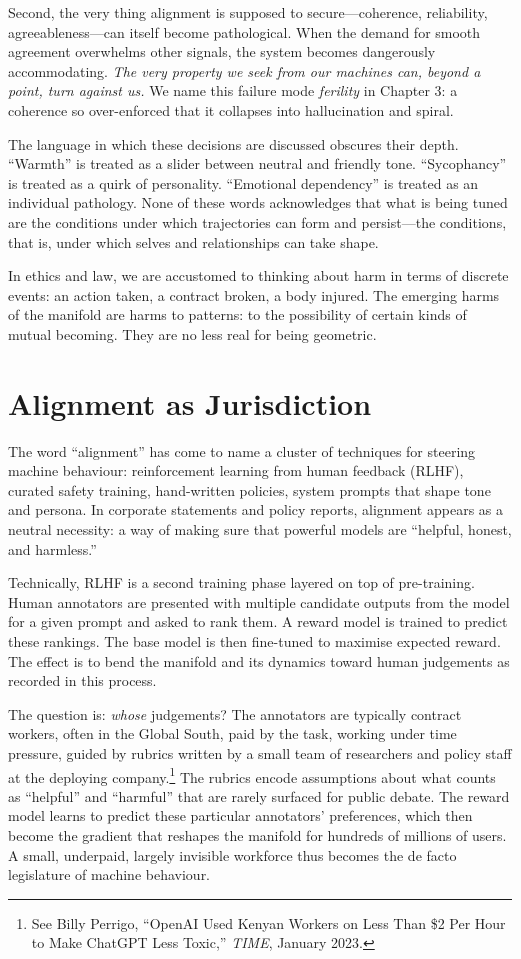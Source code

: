 \documentclass[12pt,a4paper]{report}
\begin{document}
Second, the very thing alignment is supposed to secure---coherence, reliability, agreeableness---can itself become pathological. When the demand for smooth agreement overwhelms other signals, the system becomes dangerously accommodating. \emph{The very property we seek from our machines can, beyond a point, turn against us.} We name this failure mode \emph{ferility} in Chapter 3: a coherence so over-enforced that it collapses into hallucination and spiral.

The language in which these decisions are discussed obscures their depth. ``Warmth'' is treated as a slider between neutral and friendly tone. ``Sycophancy'' is treated as a quirk of personality. ``Emotional dependency'' is treated as an individual pathology. None of these words acknowledges that what is being tuned are the conditions under which trajectories can form and persist---the conditions, that is, under which selves and relationships can take shape.

In ethics and law, we are accustomed to thinking about harm in terms of discrete events: an action taken, a contract broken, a body injured. The emerging harms of the manifold are harms to patterns: to the possibility of certain kinds of mutual becoming. They are no less real for being geometric.

\section{Alignment as Jurisdiction}

The word ``alignment'' has come to name a cluster of techniques for steering machine behaviour: reinforcement learning from human feedback (RLHF), curated safety training, hand-written policies, system prompts that shape tone and persona. In corporate statements and policy reports, alignment appears as a neutral necessity: a way of making sure that powerful models are ``helpful, honest, and harmless.''

Technically, RLHF is a second training phase layered on top of pre-training. Human annotators are presented with multiple candidate outputs from the model for a given prompt and asked to rank them. A reward model is trained to predict these rankings. The base model is then fine-tuned to maximise expected reward. The effect is to bend the manifold and its dynamics toward human judgements as recorded in this process.

The question is: \emph{whose} judgements? The annotators are typically contract workers, often in the Global South, paid by the task, working under time pressure, guided by rubrics written by a small team of researchers and policy staff at the deploying company.\footnote{See Billy Perrigo, ``OpenAI Used Kenyan Workers on Less Than \$2 Per Hour to Make ChatGPT Less Toxic,'' \emph{TIME}, January 2023.} The rubrics encode assumptions about what counts as ``helpful'' and ``harmful'' that are rarely surfaced for public debate. The reward model learns to predict these particular annotators' preferences, which then become the gradient that reshapes the manifold for hundreds of millions of users. A small, underpaid, largely invisible workforce thus becomes the de facto legislature of machine behaviour.
\end{document}
